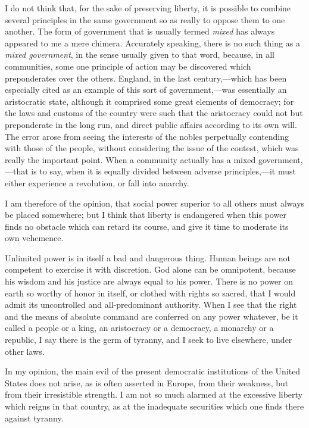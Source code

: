 I do not think that, for the sake of preserving liberty, it is
possible to combine several principles in the same government so as
really to oppose them to one another. The form of government that is
usually termed \textit{mixed} has always appeared to me a mere
chimera. Accurately speaking, there is no such thing as a
\textit{mixed government}, in the sense usually given to that word,
because, in all communities, some one principle of action may be
discovered which preponderates over the others. England, in the last
cen\-tu\-ry,---which has been especially cited as an example of this
sort of gov\-ern\-ment,---was essentially an aristocratic state,
although it comprised some great elements of democracy; for the laws
and customs of the country were such that the aristocracy could not
but preponderate in the long run, and direct public affairs according
to its own will. The error arose from seeing the interests of the
nobles perpetually contending with those of the people, without
considering the issue of the contest, which was really the important
point. When a community actually has a mixed government,---that is to
say, when it is equally divided between adverse principles,---it must
either experience a revolution, or fall into anarchy.

I am therefore of the opinion, that social power superior to all
others must always be placed somewhere; but I think  that
liberty is endangered when this power finds no obstacle which can
retard its course, and give it time to moderate its own vehemence.

Unlimited power is in itself a bad and dangerous thing. Human beings
are not competent to exercise it with discretion. God alone can be
omnipotent, because his wisdom and his justice are always equal to his
power. There is no power on earth so worthy of honor in itself, or
clothed with rights so sacred, that I would admit its uncontrolled and
all-predominant authority. When I see that the right and the means of
absolute command are conferred on any power whatever, be it called a
people or a king, an aristocracy or a democracy, a monarchy or a
republic, I say there is the germ of tyranny, and I seek to live
elsewhere, under other laws.

In my opinion, the main evil of the present democratic institutions of
the United States does not arise, as is often asserted in Europe, from
their weakness, but from their irresistible strength. I am not so much
alarmed at the excessive liberty which reigns in that country, as at
the inadequate securities which one finds there against tyranny.

